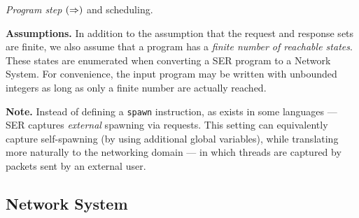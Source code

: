 \noindent\textit{Program step} $(\mathrel{\Rightarrow})$ and scheduling.


\smallskip
\noindent
\textbf{Assumptions.}
%
In addition to the assumption that the request and response sets are finite, we also assume that a program has a \textit{finite number of reachable states}. 
%
These states are enumerated when converting a SER program to a Network System. 
%
For convenience, the input program may be written with unbounded integers as long as only a finite number are actually reached. 
%
%

\smallskip
\noindent
\textbf{Note.}
Instead of defining a \texttt{spawn} instruction, as exists in some languages --- SER captures \textit{external} spawning via requests.
%
This setting can equivalently capture self-spawning (by using additional global variables), while translating more naturally to the networking domain --- in which threads are captured by packets sent by an external user.
    
    
\subsection{Network System}    
    
